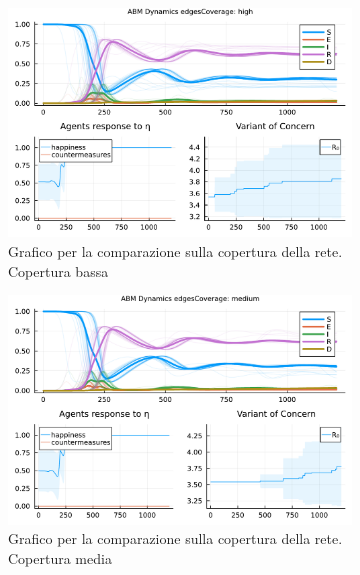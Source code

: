 \begin{figure}[!hb]
	\centering
	\begin{subfigure}[b]{0.3\textwidth}
		\centering
		\includegraphics[width=\textwidth]{img/SocialNetworkABM_1_EC.pdf}
		\caption{Grafico per la comparazione sulla copertura della rete. Copertura bassa}
		\label{fig:comparison_highCoverage}
	\end{subfigure}
	\hfill
	\begin{subfigure}[b]{0.3\textwidth}
		\centering
		\includegraphics[width=\textwidth]{img/SocialNetworkABM_2_EC.pdf}
		\caption{Grafico per la comparazione sulla copertura della rete. Copertura media}
		\label{fig:comparison_mediumCoverage}
	\end{subfigure}
	\hfill
	\begin{subfigure}[b]{0.3\textwidth}
		\centering

\end{subfigure}
\end{figure}
